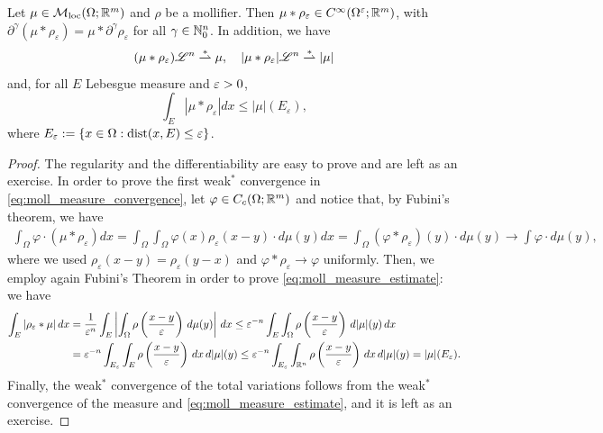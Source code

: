 \begin{theorem} \label{thm:moll_measure_prop}
Let $\mu \in \mathcal{M}_{\rm loc}(\Omega;\mathbb{R}^m)$ and $\rho$ be a mollifier. Then $\mu *
\rho_\varepsilon \in C^\infty(\Omega^\varepsilon;\mathbb{R}^m)$, with $\partial^\gamma(\mu *
\rho_\varepsilon) = \mu \ast \partial^\gamma \rho_\varepsilon$ for all $\gamma \in
\mathbb{N}_0^n$. In addition, we have
\begin{equation} \label{eq:moll_measure_convergence}
(\mu \ast \rho_\varepsilon)\mathscr{L}^{n} \overset{*}{\rightharpoonup} \mu, \quad |\mu \ast \rho_{\varepsilon}| \mathscr{L}^{n} \overset{*}{\rightharpoonup} |\mu| 
\end{equation}
and, for all $E$ Lebesgue measure and $\varepsilon > 0$, 
\begin{equation} \label{eq:moll_measure_estimate}
\int_E |\mu * \rho_\varepsilon|dx \leq |\mu|(E_\varepsilon),
\end{equation}
where $E_{\varepsilon} := \{ x \in \Omega : \operatorname{dist}(x, E) \le \varepsilon \}$.
\end{theorem}
\begin{proof}
The regularity and the differentiability are easy to prove and are left as an exercise. In order to prove the first weak$^*$ convergence in \eqref{eq:moll_measure_convergence}, let $\varphi \in C_c(\Omega;\mathbb{R}^m)$ and notice that, by Fubini's theorem, we have
\[
\begin{aligned}
\int_\Omega \varphi \cdot (\mu * \rho_\varepsilon) dx 
= \int_\Omega \int_\Omega \varphi(x) \rho_\varepsilon(x-y) \cdot d\mu(y) dx 
= \int_\Omega (\varphi * \rho_\varepsilon)(y) \cdot d\mu(y) \to \int \varphi
\cdot d\mu(y),
\end{aligned}
\]
where we used $\rho_\varepsilon(x-y) = \rho_\varepsilon(y-x)$ and
$\varphi*\rho_\varepsilon \to \varphi$ uniformly. Then, we employ again Fubini's Theorem in order to prove \eqref{eq:moll_measure_estimate}: we have
\begin{align*}
\int_{E} |\rho_{\varepsilon} \ast \mu| \, dx & = \frac{1}{\varepsilon^{n}} \int_{E} \left | \int_{\Omega} \rho\left (\frac{x - y}{\varepsilon}\right ) \, d \mu(y) \right | \, dx \le \varepsilon^{-n} \int_{E} \int_{\Omega} \rho\left (\frac{x - y}{\varepsilon}\right ) \, d |\mu|(y) \, dx \\
& = \varepsilon^{-n} \int_{E_{\varepsilon}} \int_{E} \rho\left (\frac{x - y}{\varepsilon}\right ) \, dx \, d |\mu|(y) \le \varepsilon^{-n} \int_{E_{\varepsilon}} \int_{\mathbb{R}^{n}} \rho\left (\frac{x - y}{\varepsilon}\right ) \, dx \, d |\mu|(y) = |\mu|(E_{\varepsilon}).
\end{align*}
Finally, the weak$^*$ convergence of the total variations follows from the weak$^*$ convergence of the measure and \eqref{eq:moll_measure_estimate}, and it is left as an exercise.
\end{proof}







